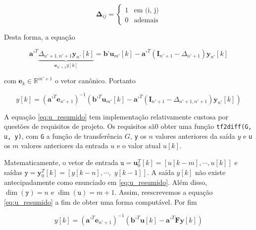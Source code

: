 \documentclass[twoside, fleqn]{article}
\begin{document}
        \begin{equation}
          \mathbf{\Delta}_{ij} = 
          \begin{cases}
               1 & \mbox{em (i, j)}\\
               0 & \mbox{ademais}
          \end{cases}
        \end{equation}
    
    Desta forma, a equação 
    
        \begin{equation}
            \textbf{a'}^T \underbrace{\Delta_{n' + 1, n' + 1} \textbf{y}_{n'}[k]}_{\textbf{e}_{n'+1} y[k]} = \textbf{b'} \textbf{u}_{m'}[k] - \textbf{a'}^T (\textbf{I}_{n'+1} - \Delta_{n' + 1}) \textbf{y}_{n'}[k]
         \end{equation}
    
    com $\textbf{e}_{k} \in \mathbb{R}^{m'+1}$ o vetor canônico. Portanto
    
        \begin{equation}
            y[k] = \left(\textbf{a'}^T \textbf{e}_{n' + 1}\right)^{-1}\left(\textbf{b'}^T \textbf{u}_{m'}[k] - \textbf{a'}^T (\textbf{I}_{n' + 1} - \Delta_{n' + 1, n' + 1}) \textbf{y}_{n'}[k]\right)
            \label{eq:u_resumido}
        \end{equation}
    
    A equação \eqref{eq:u_resumido} tem implementação relativamente custosa por questões de requisitos de projeto. Os requisitos sã0 obter uma função \texttt{tf2diff(G, u, y)}, com \texttt{G} a função de transferência $G$, \texttt{y} os $n$ valores anteriores da saída $y$ e \texttt{u} os $m$ valores anteriores da entrada $u$ e o valor atual $u[k]$.
    
    Matematicamente, o vetor de entrada $\texttt{u} = \mathbf{u}_0^T[k] = \left[u[k - m], \cdots, u[k]\right]$ e saídas $\texttt{y} = \mathbf{y}_0^T[k] = \left[y[k - n], \cdots,\right.$ $\left.y[k - 1]\right]$. A saída $y[k]$ não existe antecipadamente como enunciado em \eqref{eq:u_resumido}. Além disso, $\dim(\texttt{y}) = n$ e $\dim(\texttt{u}) = m + 1$. Assim, reescrevemos a equação \eqref{eq:u_resumido} a fim de obter uma forma computável. Por fim
    
        \begin{equation}
            y[k] = (\textbf{a'}^T \textbf{e}_{n' + 1})^{-1}(\textbf{b'}^T \textbf{u}[k] - \textbf{a'}^T \textbf{F} \textbf{y}[k])
            \label{eq:u_programacao}
        \end{equation}
    
\end{document}
